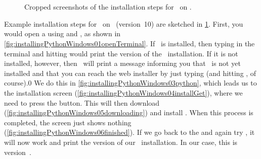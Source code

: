 %
%
\begin{figure}%
\centering%
%
\hfill%
%
%
%
\hfill%
%
%
%
\\[10pt]%
%
%
\hfill%
%
%
%
\\[10pt]%
%
%
%
\hfill%
%
%
%
\caption{Cropped screenshots of the installation steps for \python\ on \windows.}%
\label{fig:installPythonWindows}%
\end{figure}%
%
Example installation steps for \python\ on \windows\ (version~10) are sketched in \cref{fig:installPythonWindows}.
First, you would open a  using and \windowsTerminal, as shown in \cref{fig:installingPythonWindows01openTerminal}.
If \python\ is installed, then typing  in the terminal and hitting \keys{\return} would print the version of the \python\ installation.
If it is not installed, however, then \windows\ will print a message informing you that \python\ is not yet installed and that you can reach the web installer by just typing  (and hitting \keys{\return}, of course).0
We do this in \cref{fig:installingPythonWindows03python}, which leads us to the installation screen (\cref{fig:installingPythonWindows04installGet}), where we need to press the  button.
This will then download (\cref{fig:installingPythonWindows05downloading}) and install \python.
When this process is completed, the screen just shows nothing (\cref{fig:installingPythonWindows06finished}).
If we go back to the  and again try , it will now work and print the version of our \python\ installation.
In our case, this is version~.%
%
\endhsection%
%
